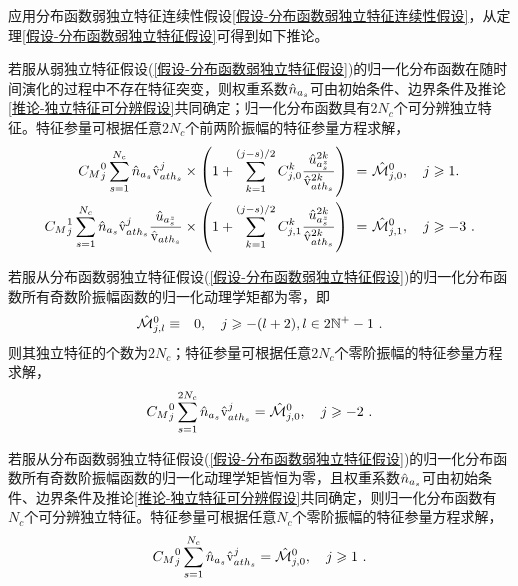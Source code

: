   应用分布函数弱独立特征连续性假设\ref{假设-分布函数弱独立特征连续性假设}，从定理\ref{假设-分布函数弱独立特征假设}可得到如下推论。
  \begin{corollary}\label{推论-分布函数弱独立特征}
      若服从弱独立特征假设(\ref{假设-分布函数弱独立特征假设})的归一化分布函数在随时间演化的过程中不存在特征突变，则权重系数$\hat{n}_{a_s}$可由初始条件、边界条件及推论\ref{推论-独立特征可分辨假设}共同确定；归一化分布函数具有$2N_c$个可分辨独立特征。特征参量可根据任意$2N_c$个前两阶振幅的特征参量方程求解，
      \begin{eqnarray}
      \begin{aligned}
            {C_M}_j^0 \sum_{s=1}^{N_c} \hat{n}_{a_s} \hat{\mathrm{v}}_{{ath}_s}^j 
            \times  \left (1 + \sum_{k=1}^{(j-s)/2} C_{j,0}^k \frac{{\hat{u}}_{a_s^z}^{2k}}{\hat{\mathrm{v}}_{{ath}_s}^{2k}} \right) \ = \ & {\hat{\mathcal{M}}}{_{j,0}^0}, \quad j \geqslant 1 . \label{MhKj00sM2}
            \\
            {C_M}_j^1 \sum_{s=1}^{N_c} \hat{n}_{a_s} \hat{\mathrm{v}}_{{ath}_s}^j \frac{ {\hat{u}}_{a_s^z}}{\hat{\mathrm{v}}_{{ath}_s}} 
            \times  \left (1 + \sum_{k=1}^{(j-s)/2} C_{j,1}^k \frac{{\hat{u}}_{a_s^z}^{2k}}{\hat{\mathrm{v}}_{{ath}_s}^{2k}} \right) \ = \ & {\hat{\mathcal{M}}}{_{j,1}^0} , \quad j \geqslant -3 ~. \label{MhKj10sM2}
      \end{aligned}
      \end{eqnarray}
  \end{corollary}
  \begin{corollary}\label{推论-分布函数弱独立特征-fM}
      若服从分布函数弱独立特征假设(\ref{假设-分布函数弱独立特征假设})的归一化分布函数所有奇数阶振幅函数的归一化动理学矩都为零，即
      \begin{eqnarray}
          {\hat{\mathcal{M}}}{_{j,l}^0} & \equiv & 0, \quad  j \geqslant -(l+2), l \in 2 \mathbb{N}^+ - 1 ~.
      \end{eqnarray}
      则其独立特征的个数为$2N_c$；特征参量可根据任意$2N_c$个零阶振幅的特征参量方程求解，
      \begin{eqnarray}
            {C_M}_j^0 \sum_{s=1}^{2N_c} \hat{n}_{a_s} \hat{\mathrm{v}}_{{ath}_s}^j  = {\hat{\mathcal{M}}}{_{j,0}^0} , \quad j \geqslant -2 ~. \label{MhKj00sM}
      \end{eqnarray}
  \end{corollary}
  \begin{corollary}\label{推论-分布函数弱独立特征-fM-Nc}
      若服从分布函数弱独立特征假设(\ref{假设-分布函数弱独立特征假设})的归一化分布函数所有奇数阶振幅函数的归一化动理学矩皆恒为零，且权重系数$\hat{n}_{a_s}$可由初始条件、边界条件及推论\ref{推论-独立特征可分辨假设}共同确定，则归一化分布函数有$N_c$个可分辨独立特征。特征参量可根据任意$N_c$个零阶振幅的特征参量方程求解，
      \begin{eqnarray}
            {C_M}_j^0 \sum_{s=1}^{N_c} \hat{n}_{a_s} \hat{\mathrm{v}}_{{ath}_s}^j  = {\hat{\mathcal{M}}}{_{j,0}^0} , \quad j \geqslant 1 ~. \label{MhKj00sM1}
      \end{eqnarray}
  \end{corollary}
  
